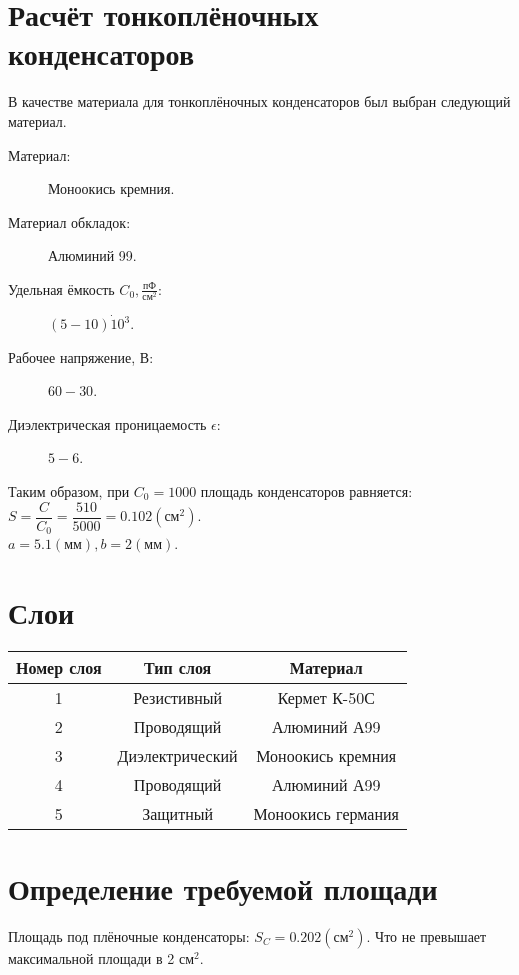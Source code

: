 \documentclass[12pt, a4paper] {ncc}
\begin{document}
\section{Расчёт тонкоплёночных конденсаторов}
	В качестве материала для тонкоплёночных конденсаторов был
	выбран следующий материал.
	\begin{description}
		\item[Материал:] Моноокись кремния.
		\item[Материал обкладок:] Алюминий 99.
		\item[Удельная ёмкость $C_0, \frac{\text{пФ}}{\text{см}^2}$:] $(5 - 10) \dot 10^3$.
		\item[Рабочее напряжение, В:] $60-30$.
		\item[Диэлектрическая проницаемость $\epsilon$:] $5-6$.
	\end{description}
	Таким образом, при $C_0 = 1000$ площадь конденсаторов равняется:\\

	$S = \dfrac{C} {C_0} = \dfrac {510} {5000} = 0.102 (\text{см}^2)$.\\

	$a = 5.1 (\text{мм}), b = 2 (\text{мм})$.
	
\newpage
\section{Слои}
	\begin{tabular}{|c|c|c|}
		\hline
		Номер слоя & Тип слоя 			& Материал \\ \hline
		  	1	   & Резистивный 		& Кермет К-50С \\ \hline
			2      & Проводящий			& Алюминий А99 \\ \hline
			3 	   & Диэлектрический	& Моноокись кремния \\ \hline
		    4 	   & Проводящий			& Алюминий А99 \\ \hline
			5	   & Защитный 			& Моноокись германия \\ \hline 
	\end{tabular}

\section{Определение требуемой площади}

	Площадь под плёночные конденсаторы: $S_C = 0.202(\text{см}^2)$.
	Что не превышает максимальной площади в 2 $\text{см}^2$.\\
\end{document}
